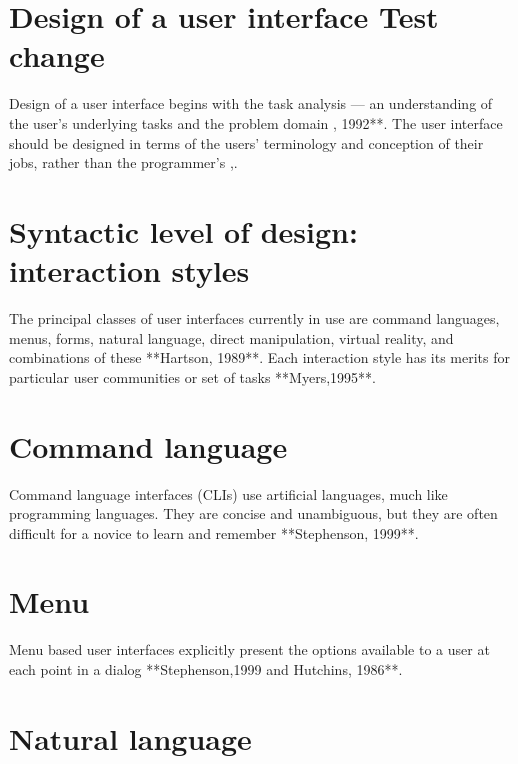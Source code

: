 \documentclass[english]{article}
\title{}
\author{Johannes Akse}
\begin{document}
\maketitle{}

\tableofcontents
\nocite{*}
\section{Design of a user interface Test change}

Design of a user interface begins with the task analysis --- an
understanding of the user's underlying tasks and the problem 
domain \parencite{shneiderman1992}, 1992**. The user interface should be 
designed in terms of the users' terminology and conception of 
their jobs, rather than the programmer's \parencite{shneiderman1983}\parencite{stephenson1999,hutchins1986},.

\section{Syntactic level of design: interaction styles}

The principal classes of user interfaces currently in use are
command languages, menus, forms, natural language, direct manipulation,
virtual reality, and combinations of these **Hartson, 1989**. Each
interaction style has its merits for particular user communities or
set of tasks **Myers,1995**.

\section{Command language}

Command language interfaces (CLIs) use artificial languages,
much like programming languages. They are concise and unambiguous, 
but they are often difficult for a novice to learn and remember 
**Stephenson, 1999**.

\section{Menu}

Menu based user interfaces explicitly present the options available to
a user at each point in a dialog **Stephenson,1999 and Hutchins,
1986**. 

\section{Natural language}
\end{document}
